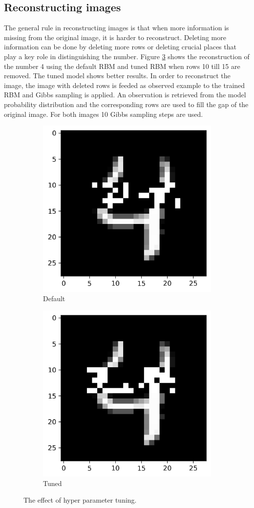 \documentclass[a4paper,10pt]{article}
\begin{document}
\subsection{Reconstructing images}
The general rule in reconstructing images is that when more information is missing from the original image, it is harder to reconstruct. Deleting more information can be done by deleting more rows or deleting crucial places that play a key role in distinguishing the number. Figure \ref{fig:hyperpara} shows the reconstruction of the number 4 using the default RBM and tuned RBM when rows 10 till 15 are removed. The tuned model shows better results. In order to reconstruct the image, the image with deleted rows is feeded as observed example to the trained RBM and Gibbs sampling is applied. An observation is retrieved from the model probability distribution and the corresponding rows are used to fill the gap of the original image. For both images 10 Gibbs sampling steps are used.

\begin{figure}[h]
	\begin{subfigure}{0.49\textwidth}
		\centering
		\includegraphics[width=0.4\linewidth]{default.png}
		\caption{Default}
		\label{fig:default}
	\end{subfigure}	 	
	\begin{subfigure}{0.49\textwidth}
		\centering
		\includegraphics[width=0.4\linewidth]{tuned.png}
		\caption{Tuned}
		\label{fig:tuned}
	\end{subfigure}	
	\caption{The effect of hyper parameter tuning.}
	\label{fig:hyperpara}
\end{figure}
\end{document}
